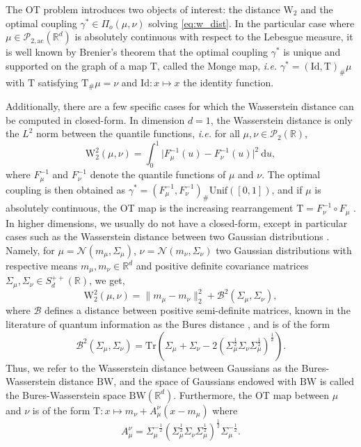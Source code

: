 \documentclass[twoside]{article}
\newcommand{\cP}{\mathcal{P}}
\newcommand{\cPa}{\mathcal{P}_{2,\mathrm{ac}}(\R^d)}
\newcommand{\cN}{\mathcal{N}}
\newcommand{\cB}{\mathcal{B}}
\newcommand{\W}{\mathrm{W}}
\newcommand{\R}{\mathbb{R}}
\newcommand{\T}{\mathrm{T}}
\newcommand{\id}{\mathrm{Id}}
\newcommand{\tr}{\mathrm{Tr}}
\newcommand{\bw}{\mathrm{BW}}
\begin{document}
 The OT problem introduces two objects of interest: the distance $\W_2$ and the optimal coupling $\gamma^*\in\Pi_o(\mu,\nu)$ solving \eqref{eq:w_dist}. In the particular case where $\mu\in\cPa$ is absolutely continuous with respect to the Lebesgue measure, it is well known by Brenier's theorem \citep{brenier1991polar} that the optimal coupling $\gamma^*$ is unique and supported on the graph of a map $\T$, called the Monge map, \emph{i.e.} $\gamma^* = (\id, \T)_\#\mu$ with $\T$ satisfying $\T_\#\mu=\nu$ and $\id:x\mapsto x$ the identity function. 


Additionally, there are a few specific cases for which the Wasserstein distance can be computed in closed-form. In dimension $d=1$, the Wasserstein distance is only the $L^2$ norm between the quantile functions, \emph{i.e.} for all $\mu,\nu\in\cP_2(\R)$,
\begin{equation} \label{eq:1d_wasserstein}
    \W_2^2(\mu,\nu) = \int_0^1 \big|F_{\mu}^{-1}(u) - F_{\nu}^{-1}(u)\big|^2\ \mathrm{d}u, %
\end{equation}
 where $F_\mu^{-1}$ and $F_{\nu}^{-1}$ denote the quantile functions of $\mu$ and $\nu$.
The optimal coupling is then obtained as $\gamma^*=(F_{\mu}^{-1}, F_{\nu}^{-1})_\#\mathrm{Unif}([0,1])$, and if $\mu$ is absolutely continuous, the OT map is the increasing rearrangement $\T = F_\nu^{-1} \circ F_{\mu}$ \citep[Theorem 2.9]{santambrogio2015optimal}. 
In higher dimensions, we usually do not have a closed-form, except in particular cases such as the Wasserstein distance between two Gaussian distributions \citep{givens1984class, gelbrich1990formula}. %
Namely, for $\mu=\cN(m_\mu,\Sigma_\mu)$, $\nu=\cN(m_\nu,\Sigma_\nu)$ two Gaussian distributions with respective means $m_\mu,m_\nu\in\R^d$ and positive definite covariance matrices $\Sigma_\mu,\Sigma_\nu\in S_d^{++}(\R)$, we get, 
\begin{equation} \label{eq:closed_form_gaussians}
    \W_2^2(\mu,\nu) = \|m_\mu-m_\nu\|_2^2 + \cB^2(\Sigma_\mu,\Sigma_\nu),
\end{equation}
where $\cB$ defines a distance between positive semi-definite matrices, known in the literature of quantum information as the Bures distance \citep{bhatia2019bures}, and is of the form
\begin{equation}
    \cB^2(\Sigma_\mu,\Sigma_\nu) = \tr\left(\Sigma_\mu+\Sigma_\nu - 2(\Sigma_\mu^\frac12 \Sigma_\nu \Sigma_\mu^\frac12)^\frac12\right).
\end{equation}
Thus, we refer to the Wasserstein distance between Gaussians as the Bures-Wasserstein distance $\bw$, and the space of Gaussians endowed with $\bw$ is called the Bures-Wasserstein space $\bw(\R^d)$. Furthermore, the OT map between $\mu$ and $\nu$ is of the form $\T:x\mapsto m_\nu + A_\mu^\nu(x-m_\mu)$ \citep[Remark 2.31]{peyre2019computational} where 
\begin{equation}
    A_\mu^\nu = \Sigma_\mu^{-\frac12}(\Sigma_\mu^\frac12 \Sigma_\nu \Sigma_\mu^\frac12)^\frac12\Sigma_\mu^{-\frac12}.
\end{equation}
\end{document}
